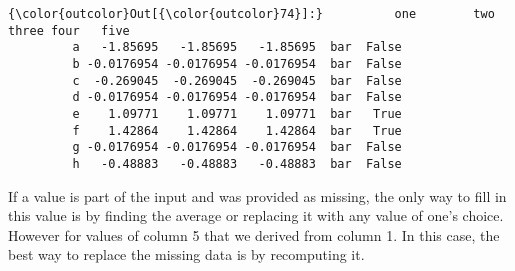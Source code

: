 \documentclass[11pt]{article}
\begin{document}
\begin{Verbatim}[commandchars=\\\{\}]
{\color{outcolor}Out[{\color{outcolor}74}]:}          one        two      three four   five
         a   -1.85695   -1.85695   -1.85695  bar  False
         b -0.0176954 -0.0176954 -0.0176954  bar  False
         c  -0.269045  -0.269045  -0.269045  bar  False
         d -0.0176954 -0.0176954 -0.0176954  bar  False
         e    1.09771    1.09771    1.09771  bar   True
         f    1.42864    1.42864    1.42864  bar   True
         g -0.0176954 -0.0176954 -0.0176954  bar  False
         h   -0.48883   -0.48883   -0.48883  bar  False
\end{Verbatim}
            
    If a value is part of the input and was provided as missing, the only
way to fill in this value is by finding the average or replacing it with
any value of one's choice. However for values of column 5 that we
derived from column 1. In this case, the best way to replace the missing
data is by recomputing it.


    
    
    
    
\end{document}
